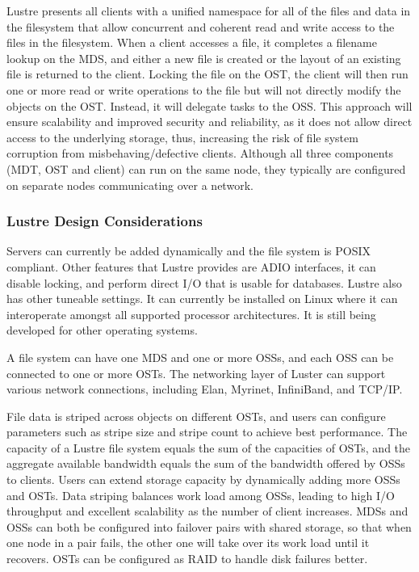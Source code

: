 \documentclass[11pt]{article}
\begin{document}
Lustre presents all clients with a unified namespace for all of the 
files and data in the filesystem that allow concurrent and coherent 
read and write access to the files in the filesystem. When a client 
accesses a file, it completes a filename lookup on the MDS, and 
either a new file is created or the layout of an existing file is 
returned to the client. Locking the file on the OST, the client will 
then run one or more read or write operations to the file but will 
not directly modify the objects on the OST. Instead, it will delegate 
tasks to the OSS. This approach will ensure scalability and improved 
security and reliability, as it does not allow direct access to the 
underlying storage, thus, increasing the risk of file system corruption 
from misbehaving/defective clients. Although all three components 
(MDT, OST and client) can run on the same node, they typically are 
configured on separate nodes communicating over a network.

\subsubsection{Lustre Design Considerations}
Servers can currently be added dynamically and the file system is 
POSIX compliant. Other features that Lustre provides are ADIO 
interfaces, it can disable locking, and perform direct I/O that is 
usable for databases. Lustre also has other tuneable settings. It can 
currently be installed on Linux where it can interoperate amongst all 
supported processor architectures. It is still being developed for 
other operating systems.

A file system can have one MDS and one or more OSSs, and each OSS can 
be connected to one or more OSTs. The networking layer of Luster can 
support various network connections, including Elan, Myrinet, InfiniBand, 
and TCP/IP.

File data is striped across objects on different OSTs, and users can 
configure parameters such as stripe size and stripe count to achieve 
best performance. The capacity of a Lustre file system equals the sum 
of the capacities of OSTs, and the aggregate available bandwidth equals 
the sum of the bandwidth offered by OSSs to clients. Users can extend 
storage capacity by dynamically adding more OSSs and OSTs. Data striping 
balances work load among OSSs, leading to high I/O throughput and 
excellent scalability as the number of client increases. MDSs and OSSs 
can both be configured into failover pairs with shared storage, so that 
when one node in a pair fails, the other one will take over its work load 
until it recovers. OSTs can be configured as RAID to handle disk failures 
better.
\end{document}
